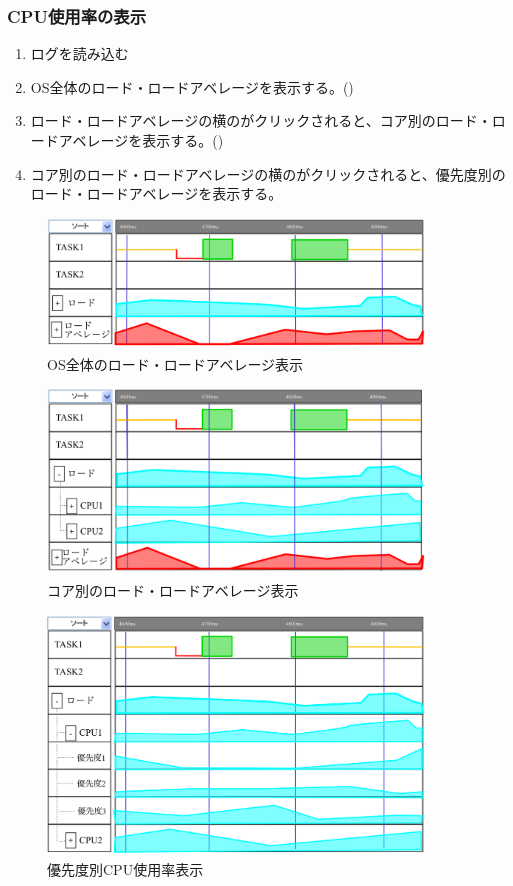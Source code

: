 \subsubsection{CPU使用率の表示}

\begin{enumerate}
\item ログを読み込む
\item OS全体のロード・ロードアベレージを表示する。()
\item ロード・ロードアベレージの横の\fbox{+}がクリックされると、コア別のロード・ロードアベレージを表示する。()
\item コア別のロード・ロードアベレージの横の\fbox{+}がクリックされると、優先度別のロード・ロードアベレージを表示する。
\end{enumerate}

\begin{figure}
\centering
\includegraphics[width=10cm]{all.png}
\caption{OS全体のロード・ロードアベレージ表示}\label{all}
\end{figure}

\begin{figure}
\centering
\includegraphics[width=10cm]{core.png}
\caption{コア別のロード・ロードアベレージ表示}\label{core}
\end{figure}

\begin{figure}
\centering
\includegraphics[width=10cm]{pri.png}
\caption{優先度別CPU使用率表示}\label{pri}
\end{figure}
